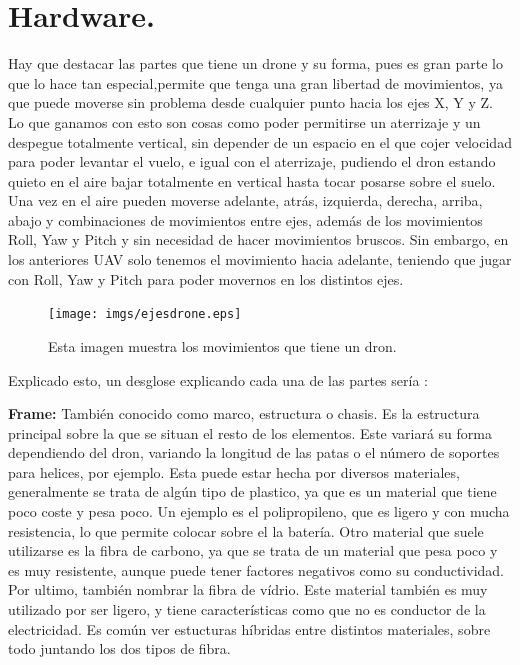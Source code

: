 \section{Hardware.}
\hspace{1 cm} Hay que destacar las partes que tiene un drone y su forma, pues es gran parte lo que lo hace tan especial,permite que tenga una gran libertad de movimientos, ya que puede moverse sin problema desde cualquier punto hacia los ejes X, Y y Z. Lo que ganamos con esto son cosas como poder permitirse un aterrizaje y un despegue totalmente vertical, sin depender de un espacio en el que cojer velocidad para poder levantar el vuelo, e igual con el aterrizaje, pudiendo el dron estando quieto en el aire bajar totalmente en vertical hasta tocar posarse sobre el suelo. Una vez en el aire pueden moverse adelante, atr\'as, izquierda, derecha, arriba, abajo y combinaciones de movimientos entre ejes, adem\'as de los movimientos Roll, Yaw y Pitch y sin necesidad de hacer movimientos bruscos. Sin embargo, en los anteriores UAV solo tenemos el movimiento hacia adelante, teniendo que jugar con Roll, Yaw y Pitch para poder movernos en los distintos ejes.

\begin{figure}[ht]
	\centering
		\texttt{[image: imgs/ejesdrone.eps]}
		\caption{Esta imagen muestra los movimientos que tiene un dron.}
	\label{fig:ejesdrone}
\end{figure}

\hspace{1 cm} Explicado esto, un desglose explicando cada una de las partes ser\'ia :

\hspace{1 cm}\textbf{Frame:} Tambi\'en conocido como marco, estructura o chasis. Es la estructura principal sobre la que se situan el resto de los elementos. Este variar\'a su forma dependiendo del dron, variando la longitud de las patas o el n\'umero de soportes para helices, por ejemplo. Esta puede estar hecha por diversos materiales, generalmente se trata de alg\'un tipo de plastico, ya que es un material que tiene poco coste y pesa poco. Un ejemplo es el polipropileno, que es ligero y con mucha resistencia, lo que permite colocar sobre el la bater\'ia. Otro material que suele utilizarse es la fibra de carbono, ya que se trata de un material que pesa poco y es muy resistente, aunque puede tener factores negativos como su conductividad. Por ultimo, tambi\'en nombrar la fibra de v\'idrio. Este material tambi\'en es muy utilizado por ser ligero, y tiene caracter\'isticas como que no es conductor de la electricidad. Es com\'un ver estucturas h\'ibridas entre distintos materiales, sobre todo juntando los dos tipos de fibra. 

